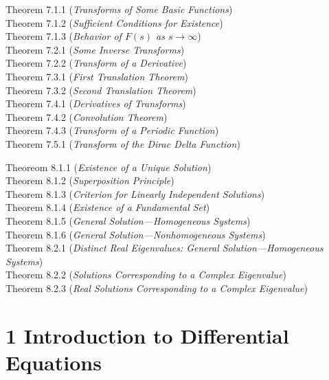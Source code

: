 \documentclass[12pt]{article}
\begin{document}
\noindent Theorem 7.1.1 (\emph{Transforms of Some Basic Functions})  \\
Theorem 7.1.2 (\emph{Sufficient Conditions for Existence})  \\
Theorem 7.1.3 (\emph{Behavior of \(F(s)\) as \(s \to \infty\)})  \\
Theorem 7.2.1 (\emph{Some Inverse Transforms})  \\
Theorem 7.2.2 (\emph{Transform of a Derivative})  \\
Theorem 7.3.1 (\emph{First Translation Theorem})  \\
Theorem 7.3.2 (\emph{Second Translation Theorem})  \\
Theorem 7.4.1 (\emph{Derivatives of Transforms})  \\
Theorem 7.4.2 (\emph{Convolution Theorem})  \\
Theorem 7.4.3 (\emph{Transform of a Periodic Function})  \\
Theorem 7.5.1 (\emph{Transform of the Dirac Delta Function})  \\

\vspace{0.5em}

\noindent Theoreom 8.1.1 (\emph{Existence of a Unique Solution})  \\
Theorem 8.1.2 (\emph{Superposition Principle})  \\
Theorem 8.1.3 (\emph{Criterion for Linearly Independent Solutions})  \\
Theorem 8.1.4 (\emph{Existence of a Fundamental Set})  \\
Theorem 8.1.5 (\emph{General Solution—Homogeneous Systems})  \\
Theorem 8.1.6 (\emph{General Solution—Nonhomogeneous Systems})  \\
Theorem 8.2.1 (\emph{Distinct Real Eigenvalues: General Solution—Homogeneous Systems})  \\
Theorem 8.2.2 (\emph{Solutions Corresponding to a Complex Eigenvalue})  \\
Theorem 8.2.3 (\emph{Real Solutions Corresponding to a Complex Eigenvalue})  \\\newpage

\section*{1 Introduction to Differential Equations}
\end{document}

